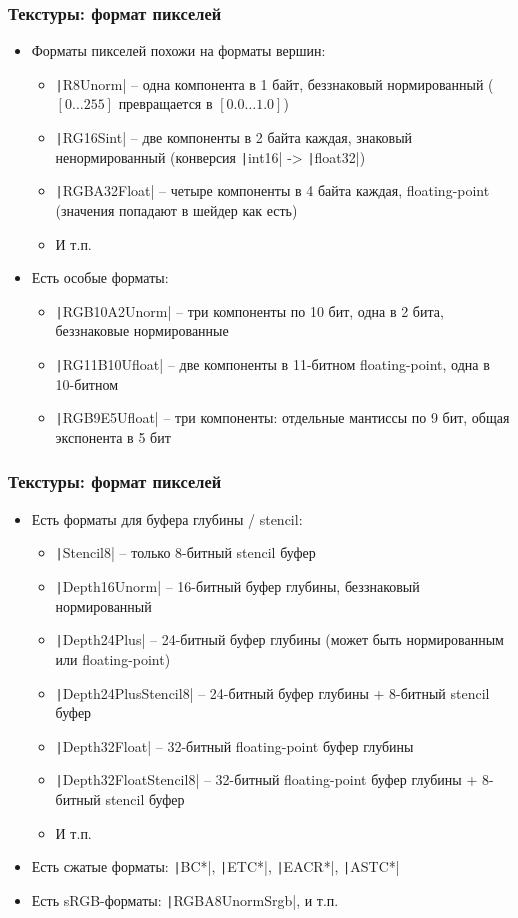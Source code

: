 \documentclass[10pt]{beamer}
\begin{document}
\begin{frame}[fragile]
\frametitle{Текстуры: формат пикселей}
\begin{itemize}
\item Форматы пикселей похожи на форматы вершин:
\begin{itemize}
\item \texttt|R8Unorm| -- одна компонента в 1 байт, беззнаковый нормированный (\([0\dots 255]\) превращается в \([0.0\dots 1.0]\))
\item \texttt|RG16Sint| -- две компоненты в 2 байта каждая, знаковый ненормированный (конверсия \texttt|int16| -> \texttt|float32|)
\item \texttt|RGBA32Float| -- четыре компоненты в 4 байта каждая, floating-point (значения попадают в шейдер как есть)
\item И т.п.
\end{itemize}
\pause
\item Есть особые форматы:
\begin{itemize}
\item \texttt|RGB10A2Unorm| -- три компоненты по 10 бит, одна в 2 бита, беззнаковые нормированные
\item \texttt|RG11B10Ufloat| -- две компоненты в 11-битном floating-point, одна в 10-битном
\item \texttt|RGB9E5Ufloat| -- три компоненты: отдельные мантиссы по 9 бит, общая экспонента в 5 бит
\end{itemize}
\end{itemize}
\end{frame}

\begin{frame}[fragile]
\frametitle{Текстуры: формат пикселей}
\begin{itemize}
\item Есть форматы для буфера глубины / stencil:
\begin{itemize}
\item \texttt|Stencil8| -- только 8-битный stencil буфер
\item \texttt|Depth16Unorm| -- 16-битный буфер глубины, беззнаковый нормированный
\item \texttt|Depth24Plus| -- 24-битный буфер глубины (может быть нормированным или floating-point)
\item \texttt|Depth24PlusStencil8| -- 24-битный буфер глубины + 8-битный stencil буфер
\item \texttt|Depth32Float| -- 32-битный floating-point буфер глубины
\item \texttt|Depth32FloatStencil8| -- 32-битный floating-point буфер глубины + 8-битный stencil буфер
\item И т.п.
\end{itemize}
\pause
\item Есть сжатые форматы: \texttt|BC*|, \texttt|ETC*|, \texttt|EACR*|, \texttt|ASTC*|
\pause
\item Есть sRGB-форматы: \texttt|RGBA8UnormSrgb|, и т.п.
\end{itemize}
\end{frame}
\end{document}
